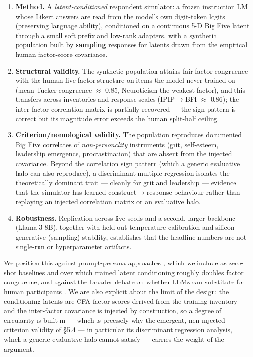 \documentclass[11pt]{article}
\begin{document}
\begin{enumerate}
\item \textbf{Method.} A \textit{latent-conditioned} respondent simulator: a frozen instruction LM whose Likert answers are read from the model's own digit-token logits (preserving language ability), conditioned on a continuous 5-D Big Five latent through a small soft prefix and low-rank adapters, with a synthetic population built by \textbf{sampling} responses for latents drawn from the empirical human factor-score covariance.
\item \textbf{Structural validity.} The synthetic population attains fair factor congruence with the human five-factor structure on items the model never trained on (mean Tucker congruence $\approx$ 0.85, Neuroticism the weakest factor), and this transfers across inventories and response scales (IPIP$\rightarrow$BFI $\approx$ 0.86); the inter-factor correlation matrix is partially recovered --- the sign pattern is correct but its magnitude error exceeds the human split-half ceiling.
\item \textbf{Criterion/nomological validity.} The population reproduces documented Big Five correlates of \textit{non-personality} instruments (grit, self-esteem, leadership emergence, procrastination) that are absent from the injected covariance. Beyond the correlation sign pattern (which a generic evaluative halo can also reproduce), a discriminant multiple regression isolates the theoretically dominant trait — cleanly for grit and leadership — evidence that the simulator has learned construct$\rightarrow$response behaviour rather than replaying an injected correlation matrix or an evaluative halo.
\item \textbf{Robustness.} Replication across five seeds and a second, larger backbone (Llama-3-8B), together with held-out temperature calibration and silicon generative (sampling) stability, establishes that the headline numbers are not single-run or hyperparameter artifacts.
\end{enumerate}

We position this against prompt-persona approaches \citep{serapiogarcia2023,jiang2023}, which we include as zero-shot baselines and over which trained latent conditioning roughly doubles factor congruence, and against the broader debate on whether LLMs can substitute for human participants \citep{dillion2023,bisbee2024}. We are also explicit about the limit of the design: the conditioning latents are CFA factor scores derived from the training inventory and the inter-factor covariance is injected by construction, so a degree of circularity is built in — which is precisely why the emergent, non-injected criterion validity of \S{}5.4 --- in particular its discriminant regression analysis, which a generic evaluative halo cannot satisfy --- carries the weight of the argument.
\end{document}
